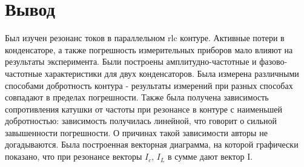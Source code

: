 \documentclass[a4paper, 12pt]{article}
\begin{document}
\section{Вывод}
Был изучен резонанс токов в параллельном rlc контуре. Активные потери в конденсаторе, а также погрешность измерительных приборов мало влияют на результаты эксперимента. Были построены амплитудно-частотные и фазово-частотные характеристики для двух конденсаторов. Была измерена различными способами добротность контура - результаты измерений при разных способах совпадают в пределах погрешности. Также была получена зависимость сопротивления катушки от частоты при резонансе в контуре с наименьшей добротностью: зависимость получилась линейной, что говорит о сильной завышенности погрешности. О причинах такой зависимости авторы не догадываются. Была построенная векторная диаграмма, на которой графически показано, что при резонансе векторы $I_{c}$, $I_{L}$ в сумме дают вектор I.
\end{document}
